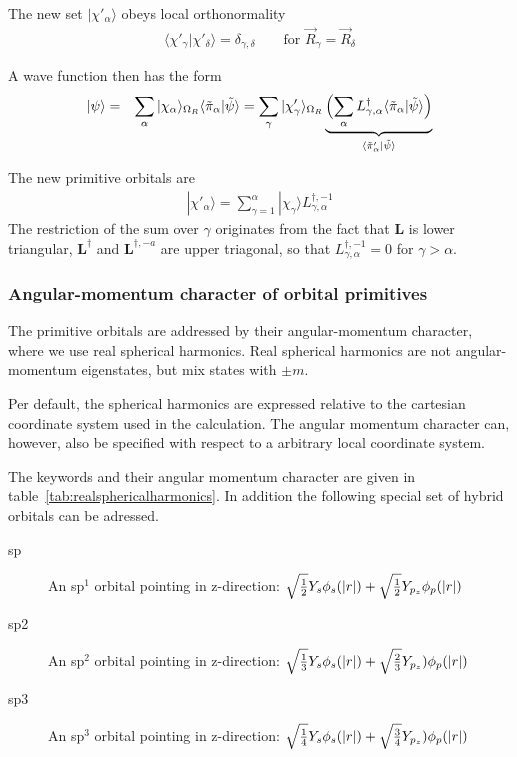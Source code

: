 \documentclass[final,12pt,makeidx,DIV=calc]{article}
\newcommand{\mat}[1]{\mathbf{#1}}
\begin{document}
{{{{{{The new set $|\chi'_\alpha\rangle$ obeys local orthonormality
\begin{eqnarray}
\langle\chi'_\gamma|\chi'_\delta\rangle=
\delta_{\gamma,\delta} \qquad\text{for $\vec{R}_\gamma=\vec{R}_\delta$}
\end{eqnarray}

A wave function then has the form
\begin{eqnarray}
|\psi\rangle
&=&\sum_{\alpha}
|\chi_\alpha\rangle_{\Omega_R}
\langle\tilde{\pi}_\alpha|\tilde\psi\rangle
=\sum_{\gamma}
|\chi'_\gamma\rangle_{\Omega_R}
\underbrace{\Bigl(
\sum_{\alpha}
L^\dagger_{\gamma,\alpha}
\langle\tilde{\pi}_\alpha|\tilde\psi\rangle
\Bigr)}_{\langle\tilde{\pi}'_\alpha|\tilde\psi\rangle}
\end{eqnarray}

The new primitive orbitals are
\begin{eqnarray}
|\chi'_\alpha\rangle=\sum_{\gamma=1}^{\alpha}
|\chi_\gamma\rangle L^{\dagger,-1}_{\gamma,\alpha}
\end{eqnarray}
The restriction of the sum over $\gamma$ originates from the fact that
$\mat{L}$ is lower triangular, $\mat{L}^\dagger$ and
$\mat{L}^{\dagger,-a}$ are upper triagonal, so that
$L^{\dagger,-1}_{\gamma,\alpha}=0$ for $\gamma>\alpha$.

\subsubsection{Angular-momentum character of orbital primitives}
\label{sec:dostoolorbitalprimitivesangularmomentum}
The primitive orbitals are addressed by their angular-momentum
character, where we use real spherical harmonics. Real spherical
harmonics are not angular-momentum eigenstates, but mix states with
$\pm m$. 

Per default, the spherical harmonics are expressed relative to the
cartesian coordinate system used in the calculation.  The angular
momentum character can, however, also be specified with respect to a
arbitrary local coordinate system.

The keywords and their angular momentum character are given in
table~\ref{tab:realsphericalharmonics}. In addition the following
special set of hybrid orbitals can be adressed.
\begin{description}
\item[sp] An sp$^1$ orbital pointing in z-direction: 
$\sqrt{1\over{2}}Y_s \phi_s(|r|) + \sqrt{1\over{2}}Y_{p_z}\phi_p(|r|)$
\item[sp2] An sp$^2$ orbital pointing in z-direction: 
$\sqrt{1\over{3}}Y_s\phi_s(|r|) + \sqrt{2\over{3}}Y_{p_z})\phi_p(|r|)$
\item[sp3] An sp$^3$ orbital pointing in z-direction: 
$\sqrt{1\over{4}}Y_s\phi_s(|r|) + \sqrt{3\over{4}}Y_{p_z})\phi_p(|r|)$
\end{description}

}}}}}}
\end{document}
